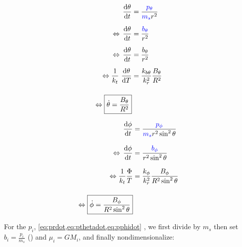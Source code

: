 \begin{align}
    \operatorname{}\frac{\mathrm{d} \theta}{\mathrm{d} t} &= \frac{\textcolor{blue}{p_\theta}}{\textcolor{blue}{m_s} r^2} \\[0.2cm]
    \Leftrightarrow \operatorname{}\frac{\mathrm{d} \theta}{\mathrm{d} t} &= \frac{\textcolor{blue}{b_\theta}}{r^2} \\[0.2cm]
    \Leftrightarrow \operatorname{}\frac{\mathrm{d} \theta}{\mathrm{d} t} &= \frac{b_\theta}{r^2} \\[0.2cm]
    \Leftrightarrow \frac{1}{k_t} \operatorname{}\frac{\mathrm{d} \theta}{\mathrm{d} T} &= \frac{k_{b\theta}}{k_r^2} \frac{B_\theta}{R^2} \\[0.4cm]
    \Leftrightarrow \boxed{\dot{\theta} = \frac{B_\theta}{R^2}} 
\end{align}

\begin{align}
    \operatorname{}\frac{\mathrm{d} \phi}{\mathrm{d} t} &= \frac{\textcolor{blue}{p_\phi}}{{\textcolor{blue}{m_s}} r^2 \sin^2{\theta}} \\[0.3cm]
    \Leftrightarrow \operatorname{}\frac{\mathrm{d} \phi}{\mathrm{d} t} &= \frac{\textcolor{blue}{b_\phi}}{r^2 \sin^2{\theta}}  \\[0.3cm]
    \Leftrightarrow \frac{1}{k_t} \frac{\Phi}{T} &= \frac{k_\phi}{k_r^2} \frac{B_\phi}{R^2 \sin^2{\theta}} \\[0.4cm]
    \Leftrightarrow \boxed{\dot{\phi} = \frac{B_\phi}{R^2 \sin^2{\theta}}}
\end{align}

For the \(p_i\), \cref{eq:prdot,eq:pthetadot,eq:pphidot} , we first divide by \(m_s\) then set \(b_i = \frac{p_i}{m_s}\) () and \(\mu_i = G M_i\), and finally nondimensionalize:

